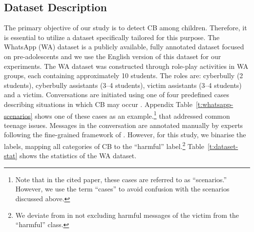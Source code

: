 \subsection{Dataset Description} 

The
primary objective of our study is to detect CB among children.
Therefore, it is essential to utilize a dataset specifically tailored for this purpose.
The WhatsApp (WA) dataset \cite{verma-etal-2023-leveraging, sprugnoli-etal-2018-creating} is a publicly available, fully annotated dataset %
focused on pre-adolescents and we use the English version of this dataset for our experiments.
The WA dataset was constructed through role-play activities in WA groups, each containing approximately 10 students.
The roles are:
    cyberbully (2 students),
    cyberbully assistants (3–4 students),
    victim assistants (3–4 students) and
    a victim.
Conversations are initiated using one of four
predefined cases describing situations in which CB may occur \cite{sprugnoli-etal-2018-creating}.
Appendix Table~\ref{t:whatsapp-scenarios} shows one of these cases as an
example.\footnote{Note
    that in the cited paper, these cases are referred to
    as ``scenarios.''
    However, we use the term ``cases'' to avoid confusion with
    the scenarios discussed above.}
that addressed common teenage issues.
Messages in the conversation are annotated manually by experts following the fine-grained framework
of .
However, for this study, we binarise the labels, mapping
all categories of CB to the ``harmful''
label.\footnote{We
    deviate from  in not excluding
    harmful messages of the victim from the ``harmful'' class.
}
Table~\ref{t:dataset-stat} shows the statistics of the WA dataset.


